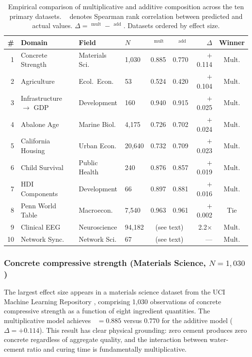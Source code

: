 \documentclass[12pt, a4paper]{article}
\theoremstyle{definition}
\theoremstyle{remark}
\DeclareMathOperator{\Spearman}{\rho_s}
\begin{document}
\begin{table}[H]
\centering
\caption{Empirical comparison of multiplicative and additive composition across the ten primary datasets. $\Spearman$ denotes Spearman rank correlation between predicted and actual values. $\Delta = \Spearman^{\text{mult}} - \Spearman^{\text{add}}$. Datasets ordered by effect size.}\label{tab:results}
\smallskip
\begin{tabular}{@{}rlllrrrc@{}}
\toprule
\# & Domain & Field & $N$ & $\Spearman^{\text{mult}}$ & $\Spearman^{\text{add}}$ & $\Delta$ & Winner \\
\midrule
1 & Concrete Strength & Materials Sci. & 1{,}030 & 0.885 & 0.770 & $+$0.114 & Mult. \\
2 & Agriculture & Ecol.\ Econ. & 53 & 0.524 & 0.420 & $+$0.104 & Mult. \\
3 & Infrastructure $\to$ GDP & Development & 160 & 0.940 & 0.915 & $+$0.025 & Mult. \\
4 & Abalone Age & Marine Biol. & 4{,}175 & 0.726 & 0.702 & $+$0.024 & Mult. \\
5 & California Housing & Urban Econ. & 20{,}640 & 0.732 & 0.709 & $+$0.023 & Mult. \\
6 & Child Survival & Public Health & 240 & 0.876 & 0.857 & $+$0.019 & Mult. \\
7 & HDI Components & Development & 66 & 0.897 & 0.881 & $+$0.016 & Mult. \\
8 & Penn World Table & Macroecon. & 7{,}540 & 0.963 & 0.961 & $+$0.002 & Tie \\
\midrule
9 & Clinical EEG & Neuroscience & 94{,}182 & \multicolumn{2}{c}{(see text)} & 2.2$\times$ & Mult. \\
10 & Network Sync. & Network Sci. & 67 & \multicolumn{2}{c}{(see text)} & --- & Mult. \\
\bottomrule
\end{tabular}
\end{table}

\subsubsection{Concrete compressive strength (Materials Science, $N = 1{,}030$)}

The largest effect size appears in a materials science dataset from the UCI Machine Learning Repository \cite{yeh1998}, comprising 1,030 observations of concrete compressive strength as a function of eight ingredient quantities. The multiplicative model achieves $\Spearman = 0.885$ versus $0.770$ for the additive model ($\Delta = +0.114$). This result has clear physical grounding: zero cement produces zero concrete regardless of aggregate quality, and the interaction between water-cement ratio and curing time is fundamentally multiplicative.
\end{document}
